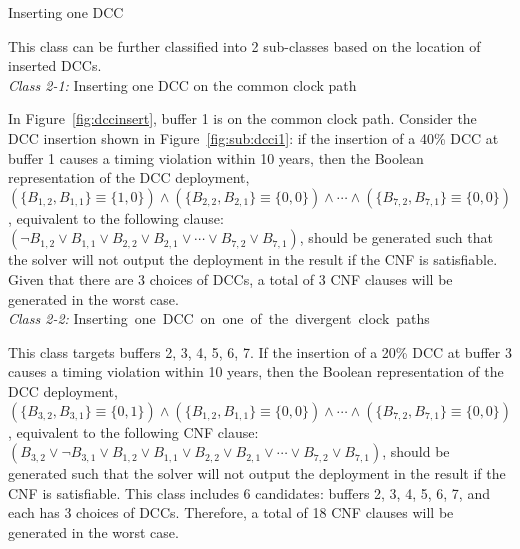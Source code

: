 \begin{class}
\label{class:c2}
Inserting one DCC

This class can be further classified into 2 sub-classes based on the location of inserted DCCs. \\
\textit{Class 2-1:} Inserting one DCC on the common clock path

In Figure~\ref{fig:dccinsert}, buffer 1 is on the common clock path. Consider the DCC insertion shown in Figure~\ref{fig:sub:dcci1}: if the insertion of a 40\% DCC at buffer 1 causes a timing violation within 10 years, then the Boolean representation of the DCC deployment, $\left(\{B_{1,2}, B_{1,1}\} \equiv \{1, 0\} \right) \land \left( \{B_{2,2}, B_{2,1}\} \equiv \{0, 0\} \right) \land \dotsb \land \left( \{B_{7,2}, B_{7,1}\} \equiv \{0, 0\} \right)$, equivalent to the following clause: $\left(\neg B_{1,2} \lor B_{1,1} \lor B_{2,2} \lor B_{2,1} \lor \dotsb \lor B_{7,2} \lor B_{7,1} \right)$, should be generated such that the solver will not output the deployment in the result if the CNF is satisfiable. Given that there are 3 choices of DCCs, a total of 3 CNF clauses will be generated in the worst case. \\
\textit{Class 2-2:} \mbox{\fontsize{9}{10.8}\selectfont Inserting one DCC on one of the divergent clock paths}

This class targets buffers 2, 3, 4, 5, 6, 7. If the insertion of a 20\% DCC at buffer 3 causes a timing violation within 10 years, then the Boolean representation of the DCC deployment, $\left(\{B_{3,2}, B_{3,1}\} \equiv \{0, 1\} \right) \land \left( \{B_{1,2}, B_{1,1}\} \equiv \{0, 0\} \right) \land \dotsb \land \left( \{B_{7,2}, B_{7,1}\} \equiv \{0, 0\} \right)$, equivalent to the following CNF clause: $\left(B_{3,2} \lor \neg B_{3,1} \lor B_{1,2} \lor B_{1,1} \lor B_{2,2} \lor B_{2,1} \lor \dotsb \lor B_{7,2} \lor B_{7,1} \right)$, should be generated such that the solver will not output the deployment in the result if the CNF is satisfiable. This class includes 6 candidates: buffers 2, 3, 4, 5, 6, 7, and each has 3 choices of DCCs. Therefore, a total of 18 CNF clauses will be generated in the worst case.
\end{class}


